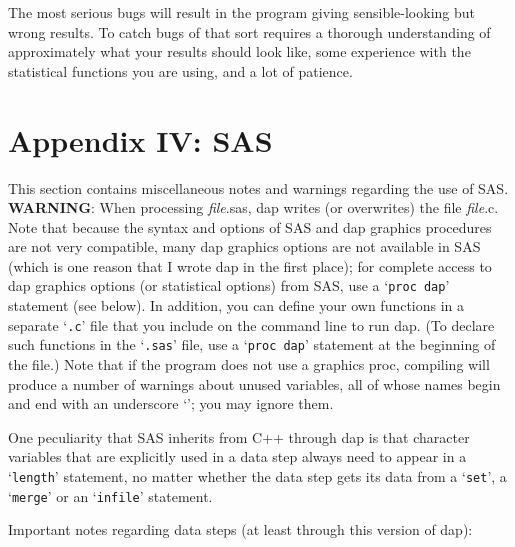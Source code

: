 \documentclass{book}
\newcommand\Texinfocommandstyletextvar[1]{{\normalfont{}\textsl{#1}}}%
\renewcommand{\_}{\Texinfounderscore\discretionary{}{}{}}
\begin{document}
The most serious bugs will result in the program giving sensible-looking
but wrong results.
To catch bugs of that sort requires a thorough understanding of
approximately what your results should look like, some experience
with the statistical functions you are using, and a lot of patience.

\chapter*{{Appendix IV: SAS}}
\label{anchor:Appendix-IV}%

%
%
This section contains miscellaneous notes and warnings regarding
the use of SAS.
\textbf{WARNING}:
When processing \Texinfocommandstyletextvar{file}.sas, dap writes (or overwrites)
the file \Texinfocommandstyletextvar{file}.c. Note that because the syntax
and options of SAS and dap graphics procedures are not very compatible,
many dap graphics options are not available in SAS (which is one reason
that I wrote dap in the first place); for complete access
to dap graphics options (or statistical options) from SAS,
use a `\texttt{proc dap}' statement (see below).
In addition, you can define your own functions in a separate `\texttt{.c}' file
that you include on the command line to run dap. (To declare such functions
in the `\texttt{.sas}' file, use a `\texttt{proc dap}' statement at the beginning
of the file.)
Note that if the program does not use a graphics proc,
compiling will produce a number of warnings about unused variables, all of whose
names begin and end with an underscore `\texttt{\_}'; you may ignore them.

One peculiarity that SAS inherits from C++ through dap
is that character variables that are explicitly
used in a data step always need to appear in a `\texttt{length}' statement,
no matter whether the data step gets its data from a
`\texttt{set}', a `\texttt{merge}' or an `\texttt{infile}' statement.

Important notes regarding data steps (at least through this version of dap):
\end{document}
